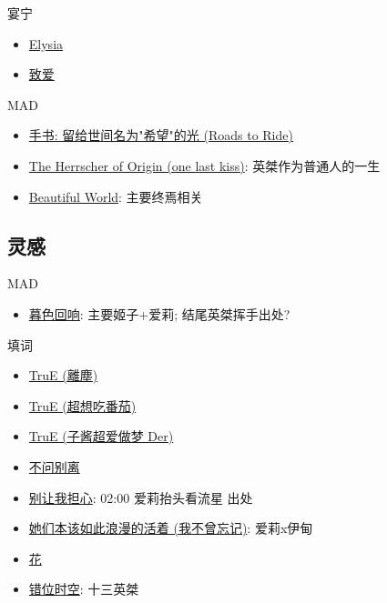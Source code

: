 \documentclass[a4paper]{article}
\begin{document}
宴宁

\begin{itemize}
    \item \href{https://www.bilibili.com/video/BV1dq4y1N7ry/}{Elysia}
    \item \href{https://www.bilibili.com/video/BV1bB4y1L7qh/}{致爱}
\end{itemize}

MAD

\begin{itemize}
    \item \href{https://www.bilibili.com/video/BV1cG41157Jx/}{手书: 留给世间名为"希望"的光 (Roads to Ride)}
    \item \href{https://www.bilibili.com/video/BV1nV4y1g7ti/}{The Herrscher of Origin (one last kiss)}: 英桀作为普通人的一生
    \item \href{https://www.bilibili.com/video/BV1XX4y1o7yN/}{Beautiful World}: 主要终焉相关
\end{itemize}

\subsection{灵感}

MAD

\begin{itemize}
    \item \href{https://www.bilibili.com/video/BV19E421c7gF/}{暮色回响}: 主要姬子+爱莉; 结尾英桀挥手出处?
\end{itemize}

填词

\begin{itemize}
    \item \href{https://www.bilibili.com/video/BV1gB4y1V7XK/}{TruE (離塵)}
    \item \href{https://www.bilibili.com/video/BV1SF411w73C/}{TruE (超想吃番茄)}
    \item \href{https://www.bilibili.com/video/BV1MB4y1V71h/}{TruE (子酱超爱做梦 Der)}
    \item \href{https://www.bilibili.com/video/BV19a4y1S7wF/}{不问别离}
    \item \href{https://www.bilibili.com/video/BV1vC4y177zp/}{别让我担心}: 02:00 爱莉抬头看流星 出处
    \item \href{https://www.bilibili.com/video/BV1pu411a7cv/}{她们本该如此浪漫的活着 (我不曾忘记)}: 爱莉x伊甸
    \item \href{https://www.bilibili.com/video/BV1DT41167gi/}{花}
    \item \href{https://www.bilibili.com/video/BV1Le4y1R73E/}{错位时空}: 十三英桀
\end{itemize}
\end{document}
